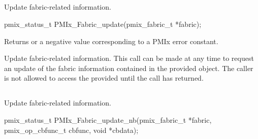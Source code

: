 \subsection{}

\summary

Update fabric-related information.

\format

\cspecificstart
\begin{codepar}
pmix_status_t
PMIx_Fabric_update(pmix_fabric_t *fabric);
\end{codepar}
\cspecificend

\begin{arglist}
\end{arglist}

Returns  or a negative value corresponding to a \ac{PMIx} error constant.

\descr

Update fabric-related information. This call can be made at any time to request an update of the fabric information contained in the provided  object. The caller is not allowed to access the provided  until the call has returned.


\subsection{}

\summary

Update fabric-related information.

\format

\cspecificstart
\begin{codepar}
pmix_status_t
PMIx_Fabric_update_nb(pmix_fabric_t *fabric,
                      pmix_op_cbfunc_t cbfunc, void *cbdata);
\end{codepar}
\cspecificend

\begin{arglist}
\end{arglist}

